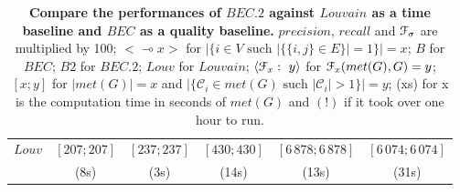 \documentclass[12pt]{article}
\theoremstyle{thmstyleone}%
\theoremstyle{definition}
\begin{document}
\begin{table}[!ht]
\begin{tabular}{| l | c c c  | c c c | c c c | c c c | c c c | }
\textbf{$Louv$}& \multicolumn{3}{c|}{$[207; 207]$}& \multicolumn{3}{c|}{$[237; 237]$}& \multicolumn{3}{c|}{$[430; 430]$}& \multicolumn{3}{c|}{$[6\,878; 6\,878]$}& \multicolumn{3}{c|}{$[6\,074; 6\,074]$} \\
& \multicolumn{3}{c|}{(8s)}& \multicolumn{3}{c|}{(3s)}& \multicolumn{3}{c|}{(14s)}& \multicolumn{3}{c|}{(13s)}& \multicolumn{3}{c|}{(31s)} \\ \hline
\end{tabular}
\bigskip
    \caption{{\bf Compare the performances of $BEC.2$ against $Louvain$ as a time baseline and $BEC$ as a quality baseline.}
    $precision$, $recall$ and $\EuScript{F}_{\sigma}$ are multiplied by 100;
    $<\multimap x>$ for $\Big|\Big\{i\in V \text{ such } \big|\big\{\{i,j\} \in E\big\}\big|=1 \Big\}\Big|=x$;
    $B$ for $BEC$;
    $B2$ for $BEC.2$;
    $Louv$ for $Louvain$;
    $\langle \EuScript{F}_{x}:~y \rangle$ for $\EuScript{F}_{x}(met(G),G)=y$;
    $[x; y]$ for $|met(G)|=x$ and $|\{\mathcal{C}_i \in met(G) \text{ such } |\mathcal{C}_i|>1\}|=y$;
    (xs) for x is the computation time in seconds of $met(G)$ and $(!)$ if it took over one hour to run.
    \label{PerfTerrain}}
\end{table}
\normalsize
\end{document}

